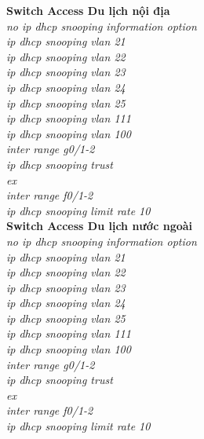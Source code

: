 \documentclass[a4paper, 12pt]{article}
\begin{document}
\hspace*{1cm}\textbf{Switch Access Du lịch nội địa}\\
\hspace*{2cm}\textit{no ip dhcp snooping information option\\
\hspace*{2cm}ip dhcp snooping vlan 21\\
\hspace*{2cm}ip dhcp snooping vlan 22\\
\hspace*{2cm}ip dhcp snooping vlan 23\\
\hspace*{2cm}ip dhcp snooping vlan 24\\
\hspace*{2cm}ip dhcp snooping vlan 25\\
\hspace*{2cm}ip dhcp snooping vlan 111\\
\hspace*{2cm}ip dhcp snooping vlan 100\\
\hspace*{2cm}inter range g0/1-2\\
\hspace*{2cm}ip dhcp snooping trust\\
\hspace*{2cm}ex\\
\hspace*{2cm}inter range f0/1-2\\
\hspace*{2cm}ip dhcp snooping limit rate 10\\}
\hspace*{1cm}\textbf{Switch Access Du lịch nước ngoài}\\
\hspace*{2cm}\textit{no ip dhcp snooping information option\\
\hspace*{2cm}ip dhcp snooping vlan 21\\
\hspace*{2cm}ip dhcp snooping vlan 22\\
\hspace*{2cm}ip dhcp snooping vlan 23\\
\hspace*{2cm}ip dhcp snooping vlan 24\\
\hspace*{2cm}ip dhcp snooping vlan 25\\
\hspace*{2cm}ip dhcp snooping vlan 111\\
\hspace*{2cm}ip dhcp snooping vlan 100\\
\hspace*{2cm}inter range g0/1-2\\
\hspace*{2cm}ip dhcp snooping trust\\
\hspace*{2cm}ex\\
\hspace*{2cm}inter range f0/1-2\\
\hspace*{2cm}ip dhcp snooping limit rate 10\\}
\end{document}

